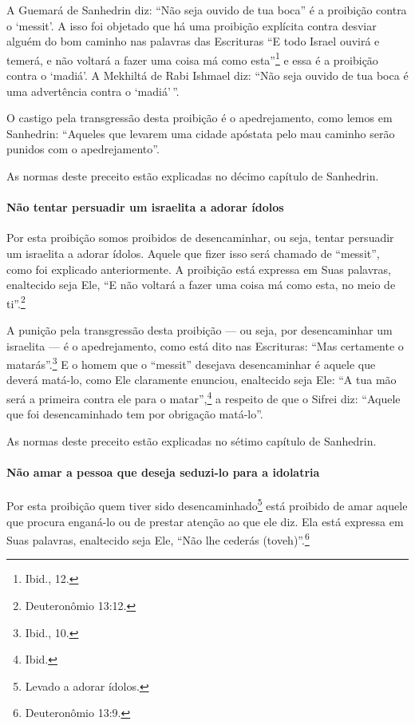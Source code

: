 A Guemará de Sanhedrin diz: ``Não seja ouvido de tua boca'' é a
proibição contra o `messit'. A isso foi objetado que há uma proibição
explícita contra desviar alguém do bom caminho nas palavras das
Escrituras ``E todo Israel ouvirá e temerá, e não voltará a fazer uma
coisa má como esta''\footnote{Ibid., 12.} e essa é a proibição contra o `madiá'.
A Mekhiltá de Rabi Ishmael diz: ``Não seja ouvido de tua boca é uma
advertência contra o `madiá'\,''.

O castigo pela transgressão desta proibição é o apedrejamento, como
lemos em Sanhedrin: ``Aqueles que levarem uma cidade apóstata pelo mau
caminho serão punidos com o apedrejamento''.

As normas deste preceito estão explicadas no décimo capítulo de Sanhedrin.

\paragraph{Não tentar persuadir um israelita a adorar ídolos}

Por esta proibição somos proibidos de desencaminhar, ou seja, tentar
persuadir um israelita a adorar ídolos. Aquele que fizer isso será
chamado de ``messit'', como foi explicado anteriormente. A proibição
está expressa em Suas palavras, enaltecido seja Ele, ``E não voltará a
fazer uma coisa má como esta, no meio de ti''.\footnote{Deuteronômio 13:12.}

A punição pela transgressão desta proibição --- ou seja, por
desencaminhar um israelita --- é o apedrejamento, como está dito nas
Escrituras: ``Mas certamente o matarás''.\footnote{Ibid., 10.} E o homem que o
``messit'' desejava desencaminhar é aquele que deverá matá-lo, como Ele
claramente enunciou, enaltecido seja Ele: ``A tua mão será a primeira
contra ele para o matar'',\footnote{Ibid.} a respeito de que o Sifrei diz:
``Aquele que foi desencaminhado tem por obrigação matá-lo''.

As normas deste preceito estão explicadas no sétimo capítulo de Sanhedrin.

\paragraph{Não amar a pessoa que deseja seduzi-lo para a idolatria}

Por esta proibição quem tiver sido desencaminhado\footnote{Levado a adorar ídolos.} está proibido
de amar aquele que procura enganá-lo ou de prestar atenção ao que ele
diz. Ela está expressa em Suas palavras, enaltecido seja Ele, ``Não lhe
cederás (toveh)''.\footnote{Deuteronômio 13:9.}

